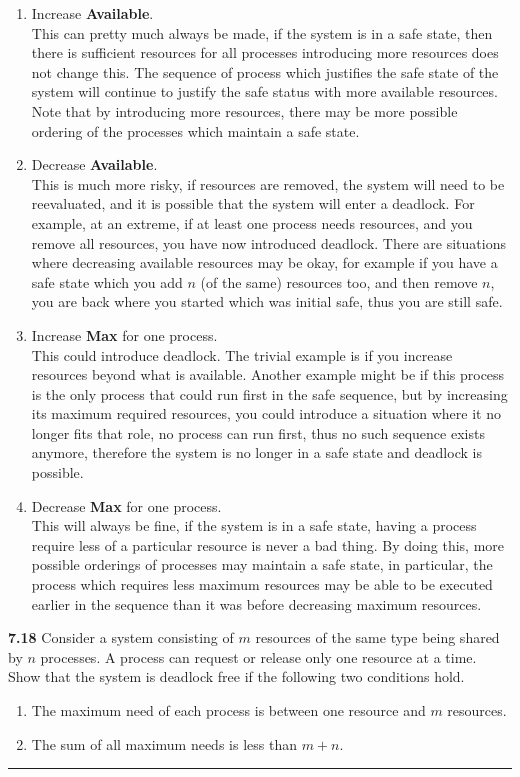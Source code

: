 \documentclass[12pt]{jhwhw}
\begin{document}
	\begin{enumerate}
		\item Increase \textbf{Available}. \\
			This can pretty much always be made, if the system is in a safe state, then there
			is sufficient resources for all processes introducing more resources does not change this.
			The sequence of process which justifies the safe state of the system will continue
			to justify the safe status with more available resources.
			Note that by introducing more resources, there may be more possible ordering of the processes
			which maintain a safe state.
		\item Decrease \textbf{Available}. \\
			This is much more risky, if resources are removed, the system will need to be reevaluated,
			and it is possible that the system will enter a deadlock. For example, at an extreme, if 
			at least one process needs resources, and you remove all resources, you have now introduced deadlock.
			There are situations where decreasing available resources may be okay, for example
			if you have a safe state which you add $n$ (of the same) resources too, and then remove $n$, you are back
			where you started which was initial safe, thus you are still safe.
		\item Increase \textbf{Max} for one process. \\
			This could introduce deadlock. The trivial example is if you increase resources beyond what is available.
			Another example might be if this process is the only process that could run first in the safe sequence,
			but by increasing its maximum required resources, you could introduce a situation where it no longer
			fits that role, no process can run first, thus no such sequence exists anymore, therefore
			the system is no longer in a safe state and deadlock is possible.
		\item Decrease \textbf{Max} for one process. \\
			This will always be fine, if the system is in a safe state, having a process require less
			of a particular resource is never a bad thing. By doing this, more possible orderings
			of processes may maintain a safe state, in particular, the process which requires less 
			maximum resources may be able to be executed earlier in the sequence than it was before
			decreasing maximum resources.
	\end{enumerate}

\clearpage
\textbf{7.18}  
	Consider a system consisting of $m$ resources of the same type being shared by $n$ processes. A
	process can request or release only one resource at a time. Show that the system is deadlock free
	if the following two conditions hold.
	\begin{enumerate}
		\item The maximum need of each process is between one resource and $m$ resources.
		\item The sum of all maximum needs is less than $m+n$.
	\end{enumerate}
\textcolor[RGB]{240,240,240}{\rule{\textwidth}{0.5pt}}\bigbreak
\end{document}

